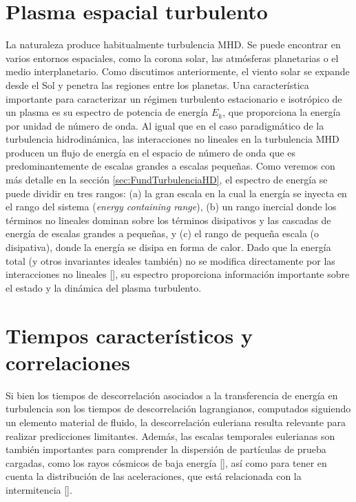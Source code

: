 \section{Plasma espacial turbulento}

La naturaleza produce habitualmente turbulencia MHD. Se puede
encontrar en varios entornos espaciales, como la corona solar, las
atmósferas planetarias o el medio interplanetario. Como discutimos
anteriormente, el viento solar se expande desde el Sol y penetra las
regiones entre los planetas. Una característica importante para
caracterizar un régimen turbulento estacionario e isotrópico de un
plasma es su espectro de potencia de energía $E_k$, que proporciona la
energía por unidad de número de onda. Al igual que en el caso
paradigmático de la turbulencia hidrodinámica, las interacciones no
lineales en la turbulencia MHD producen un flujo de energía en el
espacio de número de onda que es predominantemente de escalas grandes
a escalas pequeñas. Como veremos con más detalle en la
sección \ref{sec:FundTurbulenciaHD}, el espectro de energía se puede
dividir en tres rangos: (a) la gran escala en la cual la energía se
inyecta en el rango del sistema (\textit{energy containing range}),
(b) un rango inercial donde los términos no lineales dominan sobre los
términos disipativos y las cascadas de energía de escalas grandes a
pequeñas, y (c) el rango de pequeña escala (o disipativa), donde la
energía se disipa en forma de calor. Dado que la energía total (y
otros invariantes ideales también) no se modifica directamente por las
interacciones no lineales [\cite{frisch_turbulence:_1995}], su
espectro proporciona información importante sobre el estado y la
dinámica del plasma turbulento.



\section{Tiempos característicos y correlaciones}

Si bien los tiempos de descorrelación asociados a la transferencia de
energía en turbulencia son los tiempos de descorrelación lagrangianos,
computados siguiendo un elemento material de fluido, la descorrelación
euleriana resulta relevante para realizar predicciones
limitantes. Además, las escalas temporales eulerianas son también
importantes para comprender la dispersión de partículas de prueba
cargadas, como los rayos cósmicos de baja energía
[\cite{bieber_proton_1994}], así como para tener en cuenta la
distribución de las aceleraciones, que está relacionada con la
intermitencia [\cite{nelkin_time_1990}].

